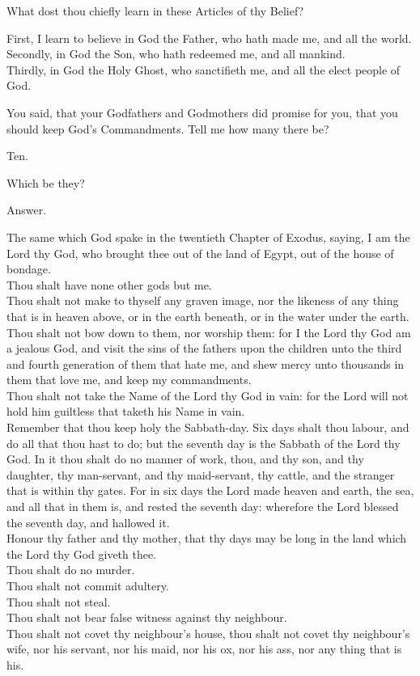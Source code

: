  What dost thou chiefly learn in these Articles of thy Belief?

   First, I learn to believe in God the Father, who hath made me, and all the world.\\
Secondly, in God the Son, who hath redeemed me, and all mankind.\\
Thirdly, in God the Holy Ghost, who sanctifieth me, and all the elect people of God.

 You said, that your Godfathers and Godmothers did promise for you, that you should keep God's Commandments. Tell me how many there be?

   Ten.

 Which be they?

\begin{rubric}
Answer.
\end{rubric}

The same which God spake in the twentieth Chapter of Exodus, saying, I am the Lord thy God, who brought thee out of the land of Egypt, out of the house of bondage.\\
    Thou shalt have none other gods but me.\\
   Thou shalt not make to thyself any graven image, nor the likeness of any thing that is in heaven above, or in the earth beneath, or in the water under the earth. Thou shalt not bow down to them, nor worship them: for I the Lord thy God am a jealous God, and visit the sins of the fathers upon the children unto the third and fourth generation of them that hate me, and shew mercy unto thousands in them that love me, and keep my commandments.\\
  Thou shalt not take the Name of the Lord thy God in vain: for the Lord will not hold him guiltless that taketh his Name in vain.\\
   Remember that thou keep holy the Sabbath-day. Six days shalt thou labour, and do all that thou hast to do; but the seventh day is the Sabbath of the Lord thy God. In it thou shalt do no manner of work, thou, and thy son, and thy daughter, thy man-servant, and thy maid-servant, thy cattle, and the stranger that is within thy gates. For in six days the Lord made heaven and earth, the sea, and all that in them is, and rested the seventh day: wherefore the Lord blessed the seventh day, and hallowed it.\\
    Honour thy father and thy mother, that thy days may be long in the land which the Lord thy God giveth thee.\\
   Thou shalt do no murder.\\
  Thou shalt not commit adultery.\\
 Thou shalt not steal.\\
   Thou shalt not bear false witness against thy neighbour.\\
    Thou shalt not covet thy neighbour's house, thou shalt not covet thy neighbour's wife, nor his servant, nor his maid, nor his ox, nor his ass, nor any thing that is his.\\

